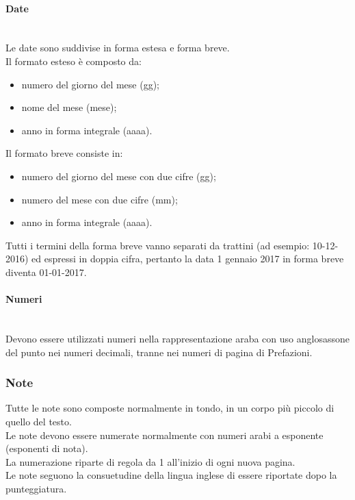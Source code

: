 \paragraph{Date} \mbox{} \\
Le date sono suddivise in forma estesa e forma breve.\\
Il formato esteso è composto da:
\begin{itemize}
	\item numero del giorno del mese (gg);
	\item nome del mese (mese);
	\item anno in forma integrale (aaaa).
\end{itemize}
Il formato breve consiste in:
\begin{itemize}
	\item numero del giorno del mese con due cifre (gg);
	\item numero del mese con due cifre (mm);
	\item anno in forma integrale (aaaa).
\end{itemize}
Tutti i termini della forma breve vanno separati da trattini (ad esempio: 10-12-2016) ed espressi in doppia cifra, pertanto la data 1 gennaio 2017 in forma breve diventa 01-01-2017.


\paragraph{Numeri} \mbox{} \\
Devono essere utilizzati numeri nella rappresentazione araba con uso anglosassone del punto nei numeri decimali, tranne nei numeri di pagina di Prefazioni.

\subsubsection{Note}
Tutte le note sono composte normalmente in tondo, in un corpo più piccolo di quello del testo.\\
Le note devono essere numerate normalmente con numeri arabi a esponente (esponenti di nota).\\
La numerazione riparte di regola da 1 all'inizio di ogni nuova pagina.\\
Le note seguono la consuetudine della lingua inglese di essere riportate dopo la punteggiatura.

